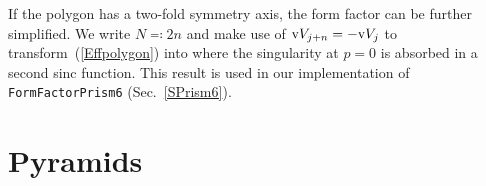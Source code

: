 If the polygon has a two-fold symmetry axis,
the form factor can be further simplified.
We write $N\eqqcolon2n$
and make use of $\text{v}{V}_{j+n}=-\text{v}{V}_j$ to transform~(\ref{Effpolygon}) into
where the singularity at $p=0$ is absorbed in a second sinc function.
This result is used in our implementation of \texttt{FormFactorPrism6}
(Sec.~\ref{SPrism6}).
%

%
%

\section{Pyramids}

%
%
%
%

